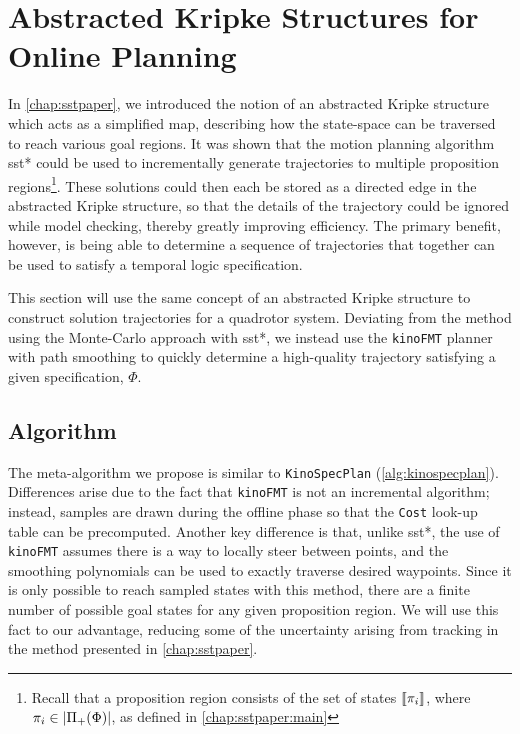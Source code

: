 \section{Abstracted Kripke Structures for Online Planning}

In \autoref{chap:sstpaper}, we introduced the notion of an abstracted Kripke structure which acts as a simplified map, describing how the state-space can be traversed to reach various goal regions. It was shown that the motion planning algorithm \gls{sst}* could be used to incrementally generate trajectories to multiple proposition regions\footnote{Recall that a proposition region consists of the set of states ${\llbracket}{} \pi_i {\rrbracket}{}$, where $\pi_i \in \left\lvert\Pi_+(\Phi)\right\rvert$, as defined in \autoref{chap:sstpaper:main}}. These solutions could then each be stored as a directed edge in the abstracted Kripke structure, so that the details of the trajectory could be ignored while model checking, thereby greatly improving efficiency. The primary benefit, however, is being able to determine a sequence of trajectories that together can be used to satisfy a temporal logic specification. 

This section will use the same concept of an abstracted Kripke structure to construct solution trajectories for a quadrotor system. Deviating from the method using the Monte-Carlo approach with \gls{sst}*, we instead use the \texttt{kinoFMT} planner with path smoothing to quickly determine a high-quality trajectory satisfying a given \mucalc{} specification, $\Phi$.

\subsection{Algorithm} 

The meta-algorithm we propose is similar to \texttt{KinoSpecPlan} (\autoref{alg:kinospecplan}). Differences arise due to the fact that \texttt{kinoFMT} is not an incremental algorithm; instead, samples are drawn during the offline phase so that the \texttt{Cost} look-up table can be precomputed. Another key difference is that, unlike \gls{sst}*, the use of \texttt{kinoFMT} assumes there is a way to locally steer between points, and the smoothing polynomials can be used to exactly traverse desired waypoints. Since it is only possible to reach sampled states with this method, there are a finite number of possible goal states for any given proposition region. We will use this fact to our advantage, reducing some of the uncertainty arising from tracking in the method presented in \autoref{chap:sstpaper}.

